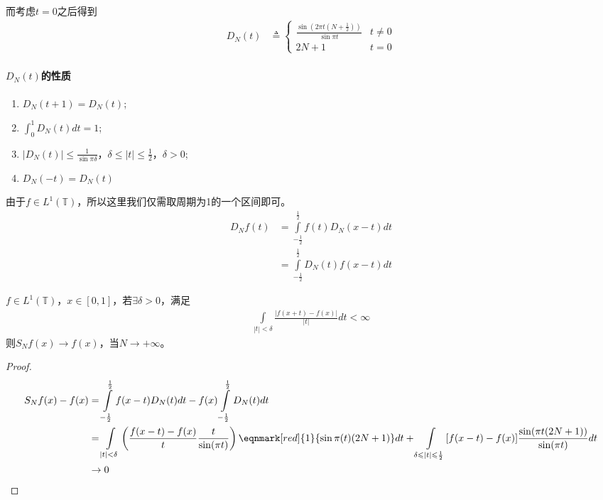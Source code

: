 而考虑$t=0$之后得到
\begin{align*}
    D_N(t) &\triangleq \left\lbrace\begin{array}{ll}
        \frac{\sin (2\pi t(N + \frac{1}{2}))}{\sin \pi t} & t\neq 0 \\
        2N + 1 & t = 0
    \end{array} \right.
\end{align*}

\paragraph{$D_N(t)$的性质}
\begin{enumerate}[leftmargin=1cm, label=\arabic*]
    \item $D_N(t+1) = D_N(t)$;
    \item $\int_0^1 D_N(t) dt = 1$;
    \item $|D_N(t)| \leqslant \frac{1}{\sin\pi\delta}$，$\delta\leqslant |t| \leqslant \frac{1}{2}$，$\delta>0$;
    \item $D_N(-t) = D_N(t)$
\end{enumerate}

由于$f\in L^1(\mathbb{T})$，所以这里我们仅需取周期为1的一个区间即可。
\begin{align*}
    D_Nf(t) &= \int\limits_{-\frac{1}{2}}^{\frac{1}{2}} f(t) D_N(x-t) dt \\
    &= \int\limits_{-\frac{1}{2}}^{\frac{1}{2}} D_N(t) f(x-t) dt
\end{align*}

\begin{theorem}[Dini判别法]
    $f\in L^1(\mathbb{T})$，$x\in[0,1]$，若$\exists \delta>0$，满足
    \begin{align*}
        \int\limits_{|t|<\delta} \frac{|f(x+t) - f(x)|}{|t|} dt < \infty
    \end{align*}
    则$S_N f(x) \to f(x)$，当$N\to+\infty$。
\end{theorem}

\begin{proof}
    \begin{align*}
        S_N f(x) - f(x) &= \int\limits_{-\frac{1}{2}}^{\frac{1}{2}} f(x-t) D_N(t) dt - f(x)\int\limits_{-\frac{1}{2}}^{\frac{1}{2}} D_N(t) dt \\
        & = \int\limits_{|t|<\delta} \left(\frac{f(x-t) - f(x)}{t} \frac{t}{\sin(\pi t)}\right) \eqnmark[red]{1}{\sin\pi(t)(2N + 1)} dt + \int\limits_{\delta\leqslant |t| \leqslant \frac{1}{2}} [f(x-t) - f(x)] \frac{\sin(\pi t(2N+1))}{\sin(\pi t)}dt \\
        & \to 0
    \end{align*}
\end{proof}

